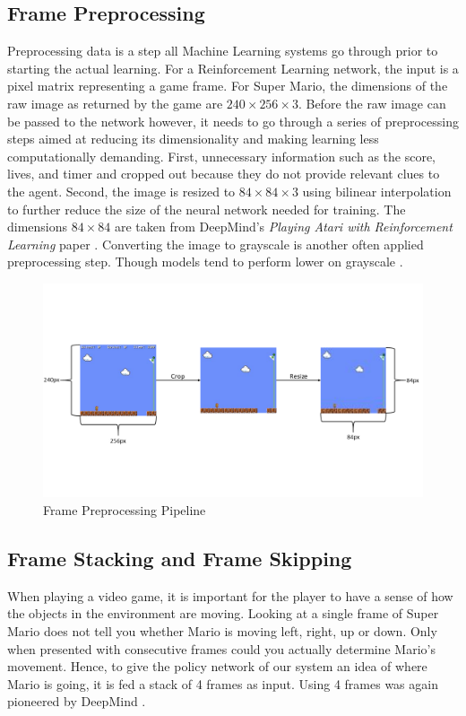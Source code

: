 \documentclass[notitlepage,a4paper,11pt]{article}
\begin{document}
\subsection{Frame Preprocessing} \label{frame_preprocessing}
Preprocessing data is a step all Machine Learning systems go through prior to starting the actual learning. For a Reinforcement Learning network, the input is a pixel matrix representing a game frame. For Super Mario, the dimensions of the raw image as returned by the game are $240 \times 256 \times 3$. Before the raw image can be passed to the network however, it needs to go through a series of preprocessing steps aimed at reducing its dimensionality and making learning less computationally demanding. First, unnecessary information such as the score, lives, and timer and cropped out because they do not provide relevant clues to the agent. Second, the image is resized to $84 \times 84 \times 3$ using bilinear interpolation \cite{gribbon2004novel} to further reduce the size of the neural network needed for training. The dimensions $84 \times 84$ are taken from DeepMind's \textit{Playing Atari with Reinforcement Learning} paper \cite{DBLP:journals/corr/MnihKSGAWR13}. Converting the image to grayscale is another often applied preprocessing step. Though models tend to perform lower on grayscale \cite{lample2017playing}.

\begin{figure}[!htb]
\centering
\includegraphics[trim={0 4.5cm 0 5cm},clip,width=1\linewidth]{figs/frame_preprocessing.png}
\caption{Frame Preprocessing Pipeline}
\end{figure}



\subsection{Frame Stacking and Frame Skipping} \label{frame_stacking_skipping}
When playing a video game, it is important for the player to have a sense of how the objects in the environment are moving. Looking at a single frame of Super Mario does not tell you whether Mario is moving left, right, up or down. Only when presented with consecutive frames could you actually determine Mario's movement. Hence, to give the policy network of our system an idea of where Mario is going, it is fed a stack of 4 frames as input. Using 4 frames was again pioneered by DeepMind \cite{DBLP:journals/corr/MnihKSGAWR13}.
\end{document}
